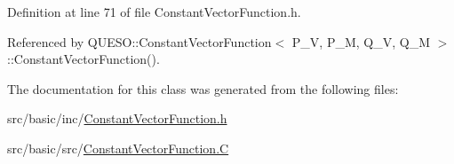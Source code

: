 Definition at line 71 of file Constant\-Vector\-Function.\-h.



Referenced by Q\-U\-E\-S\-O\-::\-Constant\-Vector\-Function$<$ P\-\_\-\-V, P\-\_\-\-M, Q\-\_\-\-V, Q\-\_\-\-M $>$\-::\-Constant\-Vector\-Function().



The documentation for this class was generated from the following files\-:\begin{DoxyCompactItemize}
\item 
src/basic/inc/\hyperlink{_constant_vector_function_8h}{Constant\-Vector\-Function.\-h}\item 
src/basic/src/\hyperlink{_constant_vector_function_8_c}{Constant\-Vector\-Function.\-C}\end{DoxyCompactItemize}
